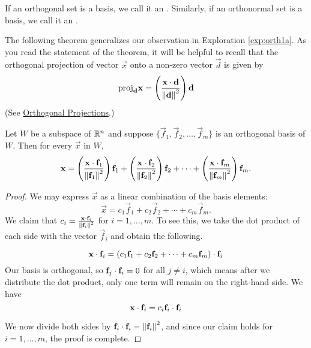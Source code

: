 \documentclass{ximera}
\begin{document}
If an orthogonal set is a basis, we call it an
. Similarly, if an orthonormal set is a basis, we call it an .


The following theorem generalizes our observation in Exploration \ref{exp:orth1a}.  As you read the statement of the theorem, it will be helpful to recall that the orthogonal projection of vector $\vec{x}$ onto a non-zero vector $\vec{d}$ is given by
\begin{equation}\label{eq:orthProj}
\mbox{proj}_{\mathbf{d}}\mathbf{x}=\left(\frac{\mathbf{x}\cdot\mathbf{d}}{\left\lVert\mathbf{d}\right\rVert^2}\right)\mathbf{d}
\end{equation}
(See \href{https://ximera.osu.edu/linearalgebradzv3/LinearAlgebraInteractiveIntro/VEC-0070/main}{Orthogonal Projections}.)

\begin{theorem}\label{th:fourierexpansion}
Let $W$ be a subspace of $\mathbb{R}^n$ and suppose $\{ \vec{f}_1, \vec{f}_2, \ldots, \vec{f}_m \}$
is an orthogonal basis of $W$.
Then for every $\vec{x}$ in $W$,
\begin{equation}\label{FourierEqn}
\mathbf{x} =
\left(\frac{\mathbf{x}\cdot \mathbf{f}_1}{\left\lVert\mathbf{f}_1\right\rVert^2}\right) \mathbf{f}_1 +
\left(\frac{\mathbf{x}\cdot \mathbf{f}_2}{\left\lVert\mathbf{f}_2\right\rVert^2}\right) \mathbf{f}_2 +
\cdots +
\left(\frac{\mathbf{x}\cdot \mathbf{f}_m}{\left\lVert\mathbf{f}_m\right\rVert^2}\right) \mathbf{f}_m.
\end{equation}
\end{theorem}

\begin{proof}
We may express $\vec{x}$ as a linear combination of the basis elements:
\[ \vec{x} =
c_1 \vec{f}_1 +
c_2 \vec{f}_2 +
\cdots +
c_m \vec{f}_m.
\]
We claim that $c_i = \frac{\mathbf{x}\cdot \mathbf{f}_i}{\left\lVert\mathbf{f}_i\right\rVert^2}$ for $i=1,\ldots,m$. To see this, we take the dot product of
each side with the vector $\vec{f}_i$ and obtain the following.

\begin{equation*}
  \mathbf{x} \cdot \mathbf{f}_i =  \left(c_1\mathbf{f}_1 +
c_2\mathbf{f}_2 +
\cdots +
c_m\mathbf{f}_m\right) \cdot \mathbf{f}_i 
\end{equation*}
Our basis is orthogonal, so $\mathbf{f}_j \cdot \mathbf{f}_i = 0$ for all $j \neq i$, which means after we distribute the dot product, only one term will remain on the right-hand side.  We have 
\begin{equation*}
  \mathbf{x} \cdot \mathbf{f}_i =  c_i\mathbf{f}_i \cdot \mathbf{f}_i 
\end{equation*}

We now divide both sides by $\mathbf{f}_i \cdot \mathbf{f}_i = \left\lVert\mathbf{f}_i\right\rVert^2$, and since our claim holds for $i=1,\ldots,m$, the proof is complete.
\end{proof}
\end{document}
